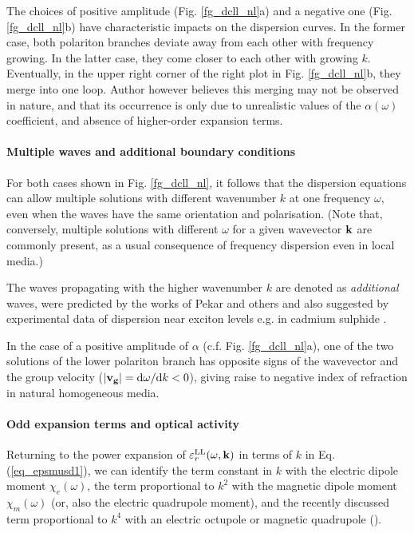 The choices of positive amplitude (Fig. \ref{fg_dcll_nl}a) and a negative one (Fig. \ref{fg_dcll_nl}b) have characteristic impacts on the dispersion curves. In the former case, both polariton branches deviate away from each other with frequency growing. In the latter case, they come closer to each other with growing $k$. Eventually, in the upper right corner of the right plot in Fig. \ref{fg_dcll_nl}b, they merge into one loop. Author however believes this merging may not be observed in nature, and that its occurrence is only due to unrealistic values of the $\alpha(\omega)$ coefficient, and absence of higher-order expansion terms.

\paragraph{Multiple waves and additional boundary conditions}   %
For both cases shown in Fig. \ref{fg_dcll_nl}, it follows that the dispersion equations can allow multiple solutions with different wavenumber $k$ at one frequency $\omega$, even when the waves have the same orientation and polarisation. (Note that, conversely, multiple solutions with different $\omega$ for a given wavevector ${\mathbf{k}}$ are commonly present, as a usual consequence of frequency dispersion even in local media.)

The waves propagating with the higher wavenumber $k$ are denoted as \textit{additional} waves, were predicted by the works of Pekar and others
and also suggested by experimental data of dispersion near exciton levels e.g. in cadmium sulphide
\cite{pekar1975spatial}. 

In the case of a positive amplitude of $\alpha$ (c.f. Fig. \ref{fg_dcll_nl}a), one of the two solutions of the lower polariton branch has opposite signs of the wavevector and the group velocity ($|{\mathbf{v_g}}| = \mathrm{d}\omega/\mathrm{d}k < 0$), giving raise to negative index of refraction in natural homogeneous media.

\paragraph{Odd expansion terms and optical activity }   %
Returning to the power expansion of $\varepsilon_r^\text{LL}(\omega, {\mathbf{k}})$ in terms of $k$ in Eq. (\ref{eq_epsmusd1}), we can identify the term constant in $k$ with the electric dipole moment $\chi_e(\omega)$, the term proportional to $k^2$ with the magnetic dipole moment $\chi_m(\omega)$ (or, also the electric quadrupole moment), and the recently discussed term proportional to $k^4$ with an electric octupole or magnetic quadrupole (\cite{agranovich2006spatial, agranovich2004linear, krowne2007book}).


